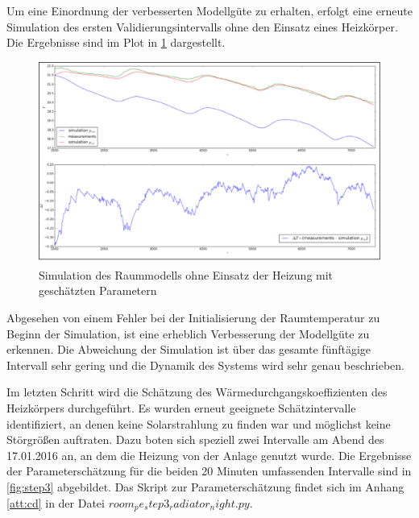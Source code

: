 Um eine Einordnung der verbesserten Modellgüte zu erhalten, erfolgt eine erneute Simulation des ersten Validierungsintervalls ohne den Einsatz eines Heizkörper. Die Ergebnisse sind im Plot in \ref{fig:valid1pe} dargestellt.

\begin{figure}
\centering
\includegraphics[width=\textwidth]{abbildungen/20160329_validierung1pe}
\caption{Simulation des Raummodells ohne Einsatz der Heizung mit geschätzten Parametern}
\label{fig:valid1pe}
\end{figure}

Abgesehen von einem Fehler bei der Initialisierung der Raumtemperatur zu Beginn der Simulation, ist eine erheblich Verbesserung der Modellgüte zu erkennen. Die Abweichung der Simulation ist über das gesamte fünftägige Intervall sehr gering und die Dynamik des Systems wird sehr genau beschrieben.

Im letzten Schritt wird die Schätzung des Wärmedurchgangskoeffizienten des Heizkörpers durchgeführt. Es wurden erneut geeignete Schätzintervalle identifiziert, an denen keine Solarstrahlung zu finden war und möglichst keine Störgrößen auftraten. Dazu boten sich speziell zwei Intervalle am Abend des 17.01.2016 an, an dem die Heizung von der Anlage genutzt wurde. Die Ergebnisse der Parameterschätzung für die beiden 20 Minuten umfassenden Intervalle sind in \ref{fig:step3} abgebildet. Das Skript zur Parameterschätzung findet sich im Anhang \ref{att:cd} in der Datei $room_pe_step3_radiator_night.py$.

